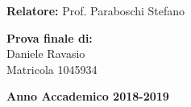 \begin{titlepage}
        \vspace{50mm}

        \noindent
        {\large \textbf{Relatore:} Prof. Paraboschi Stefano} \\


        \vspace{15mm}

        \begin{flushright}
            {\large \textbf{Prova finale di:}} \\
            \large{Daniele Ravasio} \\
            \large{Matricola 1045934}
        \end{flushright}
        \begin{center}
            {\large{\bf Anno Accademico 2018-2019}}
        \end{center}

        \restoregeometry

    \end{titlepage}
